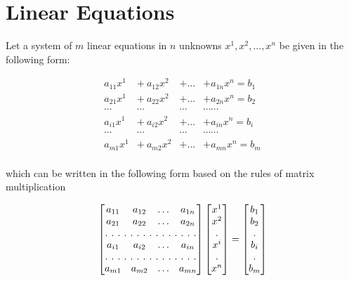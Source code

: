 \section{Linear Equations}

Let a system of $m$ linear equations in $n$ unknowns $x^1, x^2, ..., x^n$ be given in the following form:


\begin{equation}
\begin{array}{cccc}
a_{11}x^1  &+ ~a_{12}x^2   & + \hdots  &+  a_{1n}x^n   = b_1 \\
a_{21}x^1  &+ ~ a_{22}x^2   &+ \hdots  &+  a_{2n}x^n   = b_2 \\
 \cdots       &\cdots            &\cdots      &\cdots                \cdots \\
a_{i1}x^1   &+  ~a_{i2}x^2    & + \hdots  &+  a_{in}x^n    = b_i \\
 \cdots       &\cdots            &\cdots      &\cdots                 \cdots\\
a_{m1}x^1 &+  ~a_{m2}x^2 & + \hdots  & +  a_{mn}x^n = b_m \\
\end{array}
\label{LinearSystem}
\end{equation}

which can be written in the following form based on the rules of matrix multiplication

\begin{equation}
\begin{bmatrix}
a_{11} & a_{12}  & \hdots & a_{1n}  \\
a_{21} & a_{22}  & \hdots & a_{2n}  \\
\hdotsfor[2]{4}\\
a_{i1} & a_{i2}  & \hdots & a_{in}  \\
\hdotsfor[2]{4}\\
a_{m1} & a_{m2}  & \hdots & a_{mn}  \\
\end{bmatrix}
\begin{bmatrix}
x^1\\
x^2\\
.\\
x^i\\
.\\
x^n\\
\end{bmatrix}
=
\begin{bmatrix}
b_1\\
b_2\\
.\\
b_i\\
.\\
b_m\\
\end{bmatrix}
\label{MatrixSystem}
\end{equation}

